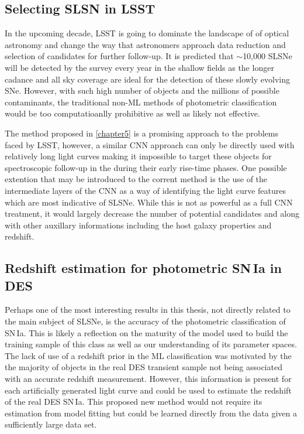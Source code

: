 \subsection{Selecting SLSN in LSST}
In the upcoming decade, LSST is going to dominate the landscape of of optical astronomy and change the way that astronomers approach data reduction and selection of candidates for further follow-up. It is predicted that $\sim$10,000 SLSNe will be detected by the survey every year in the shallow fields as the longer cadance and all sky coverage are ideal for the detection of these slowly evolving SNe. However, with such high number of objects and the millions of possible contaminants, the traditional non-ML methods of photometric classification would be too computatioanlly prohibitive as well as likely not effective.

The method proposed in \cref{chapter5} is a promising approach to the problems faced by LSST, however, a similar CNN approach can only be directly used with relatively long light curves making it impossible to target these objects for spectroscopic follow-up in the during their early rise-time phases. One possible extention that may be introduced to the corrent method is the use of the intermediate layers of the CNN as a way of identifying the light curve features which are most indicative of SLSNe. While this is not as powerful as a full CNN treatment, it would largely decrease the number of potential candidates and along with other auxillary informations including the host galaxy properties and redshift.

\subsection{Redshift estimation for photometric SN\,Ia in DES}
Perhaps one of the most interesting results in this thesis, not directly related to the main subject of SLSNe, is the accuracy of the photometric classification of SN\,Ia. This is likely a reflection on the maturity of the model used to build the training sample of this class as well as our understanding of its parameter spaces. The lack of use of a redshift prior in the ML classification was motivated by the the majority of objects in the real DES transient sample not being associated with an accurate redshift measurement. However, this information is present for each artificially generated light curve and could be used to estimate the redshift of the real DES SN\,Ia. This proposed new method would not require its estimation from model fitting but could be learned directly from the data given a sufficiently large data set.
